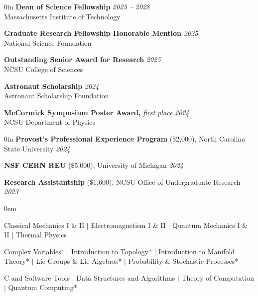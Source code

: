 \documentclass{cv}
\begin{document}
\begin{adjustwidth}{\spacing}{0in}
    \textbf{Dean of Science Fellowship}
    \hfill{\textsl{2025 -- 2028}}\\
    \tabto{\spacing} Massachusetts Institute of Technology
    \vspace{0.3em}

    \textbf{Graduate Research Fellowship Honorable Mention}
    \hfill{\textsl{2025}}\\
    \tabto{\spacing} National Science Foundation
    \vspace{0.3em}

    \textbf{Outstanding Senior Award for Research}
    \hfill{\textsl{2025}}\\
    \tabto{\spacing} NCSU College of Sciences
    \vspace{0.3em}

    \textbf{Astronaut Scholarship}
    \hfill{\textsl{2024}}\\
    \tabto{\spacing} Astronaut Scholarship Foundation
    \vspace{0.3em}

    \textbf{McCormick Symposium Poster Award,}
    \textit{first place}
    \hfill{\textsl{2024}}\\
    \tabto{\spacing} NCSU Department of Physics
\end{adjustwidth}
\vspace{0.6em}


\begin{adjustwidth}{\spacing}{0in}
    \textbf{Provost's Professional Experience Program} (\$2,000),
    North Carolina State University
    \hfill \textsl{2024}

    \textbf{NSF CERN REU} (\$5,000),
    University of Michigan
    \hfill \textsl{2024}

    \textbf{Research Assistantship} (\$1,600),
    NCSU Office of Undergraduate Research
    \hfill \textsl{2023}
\end{adjustwidth}
\vspace{0.6em}


\vspace{0.2em}

\vspace{0.6em}


\vspace{-0.12in}

\begin{description}[leftmargin=!,labelwidth=10pt]
    \itemsep0em
    \item [Physics:] Classical Mechanics I \& II $|$ Electromagnetism I \& II
        $|$ Quantum Mechanics I \& II $|$ Thermal Physics
    \item [Math:] Complex Variables* $|$ Introduction to Topology* $|$
        Introduction to Manifold Theory* $|$ Lie Groups \& Lie Algebras* $|$
        Probability \& Stochastic Processes*
    \item [Computer Science:] C and Software Tools $|$ Data Structures and
        Algorithms $|$ Theory of Computation $|$ Quantum Computing*
\end{description}
\end{document}
